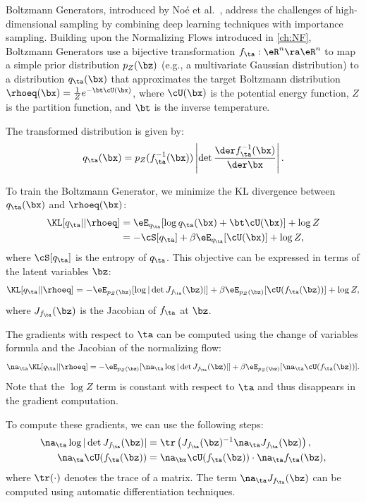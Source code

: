 Boltzmann Generators, introduced by Noé et al.~\cite{Noe2019Boltzmann}, address the challenges of high-dimensional sampling by combining deep learning techniques with importance sampling. Building upon the Normalizing Flows introduced in \cref{ch:NF}, Boltzmann Generators use a bijective transformation $f_\ta: \eR^n \ra \eR^n$ to map a simple prior distribution $p_Z(\bz)$ (e.g., a multivariate Gaussian distribution) to a distribution $q_\ta(\bx)$ that approximates the target Boltzmann distribution $\rhoeq(\bx) = \frac{1}{Z} e^{-\bt \cU(\bx)}$, where $\cU(\bx)$ is the potential energy function, $Z$ is the partition function, and $\bt$ is the inverse temperature.

The transformed distribution is given by:
\begin{align}
    q_\ta(\bx) = p_Z(f_\ta^{-1}(\bx)) \left|\det \frac{\der f_\ta^{-1}(\bx)}{\der \bx}\right|. \label{eq:bg_transformed_dist}
\end{align}

To train the Boltzmann Generator, we minimize the KL divergence between $q_\ta(\bx)$ and $\rhoeq(\bx)$:
\begin{align}
    \KL[q_\ta||\rhoeq] &= \eE_{q_\ta}[\log q_\ta(\bx) + \bt \cU(\bx)] + \log Z \label{eq:bg_kl}\\
                       &= -\cS[q_\ta] + \beta \eE_{q_\ta}[\cU(\bx)] + \log Z, \label{eq:bg_kl_entropy}
\end{align}
where $\cS[q_\ta]$ is the entropy of $q_\ta$. This objective can be expressed in terms of the latent variables $\bz$:
\begin{align}
    \KL[q_\ta || \rhoeq] = -\eE_{p_Z(\bz)}[\log |\det J_{f_\ta}(\bz)|] + \beta \eE_{p_Z(\bz)}[\cU(f_\ta(\bz))] + \log Z, \label{eq:bg_kl_latent}
\end{align}
where $J_{f_\ta}(\bz)$ is the Jacobian of $f_\ta$ at $\bz$.

The gradients with respect to $\ta$ can be computed using the change of variables formula and the Jacobian of the normalizing flow:
\begin{align}
    \na_\ta \KL[q_\ta || \rhoeq] = -\eE_{p_Z(\bz)}[\na_\ta \log |\det J_{f_\ta}(\bz)|] + \beta \eE_{p_Z(\bz)}[\na_\ta \cU(f_\ta(\bz))]. \label{eq:bg_kl_gradient}
\end{align}
Note that the $\log Z$ term is constant with respect to $\ta$ and thus disappears in the gradient computation.

To compute these gradients, we can use the following steps:
\begin{align}
    \na_\ta \log |\det J_{f_\ta}(\bz)| &= \tr\left(J_{f_\ta}(\bz)^{-1} \na_\ta J_{f_\ta}(\bz)\right), \label{eq:bg_jacobian_grad}\\
    \na_\ta \cU(f_\ta(\bz))            &= \na_\bx \cU(f_\ta(\bz)) \cdot \na_\ta f_\ta(\bz), \label{eq:bg_potential_grad}
\end{align}
where $\tr(\cdot)$ denotes the trace of a matrix. The term $\na_\ta J_{f_\ta}(\bz)$ can be computed using automatic differentiation techniques.


